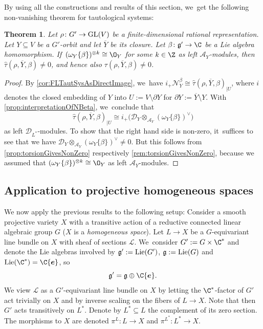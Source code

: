 \documentclass[JEP,XML,SOM,Unicode,published]{cedram}
\newcommand{\bme}{{\boldsymbol{e}}}
\newtheorem{thm}{Theorem}[section]
\newcommand{\cA}{\mathscr{A}}
\newcommand{\Ell}{\mathscr{L}}
\newcommand{\frg}{\mathfrak{g}}
\DeclareMathOperator{\GL}{\textup{GL}}
\DeclareMathOperator{\Lie}{\textup{Lie}}
\newcommand\restr[2]{{#1_{| {#2}}}}
\begin{document}
By using all the constructions and results of this section, we~get the following non-vanishing theorem for tautological systems:

\begin{thm} \label{thm:nonZeroGeneralSetup}
Let $\rho \colon G' \to \GL(V)$ be a finite-dimensional rational representation. Let $Y \subseteq V$ be a $G'$-orbit and let $\overline{Y}$ be its closure. Let $\beta \colon \frg' \to \C$ be a Lie algebra homomorphism. If~$(\omega_Y\{\beta\})^{\otimes k} \cong \O_Y$ for some $k\in \Z$ as left $\cA_Y$\nobreakdash-mod\-ules,
then $\hat{\tau}(\rho, \overline{Y}, \beta) \neq 0$, and hence also $\tau(\rho, \overline{Y}, \beta) \neq 0$.
\end{thm}

\begin{proof}
By \cref{cor:FLTautSysAsDirectImage}, we~have $i_+ \mathscr N_Y^{\beta} \cong \restr{\hat\tau(\rho,\overline Y, \beta)}{U}$, where $i$ denotes the closed embedding of $Y$ into $U := V \setminus \partial Y$ for $\partial Y := \overline Y \setminus Y$. With \cref{prop:interpretationOfNBeta}, we~conclude that
\[
\restr{\hat{\tau}(\rho,\overline Y,\beta)}{U} \cong i_+\big(\mathscr{D}_{Y} \otimes_{\cA_{Y}} (\omega_{Y}\{\beta\})^\vee\big)
\]
as left $\mathscr{D}_{L^*}$\nobreakdash-mod\-ules. To show that the right hand side is non-zero, it~suffices to see that we have $\mathscr{D}_{Y} \otimes_{\cA_{Y}} (\omega_{Y}\{\beta\})^\vee \neq 0$.
But this follows from \cref{prop:torsionGivesNonZero} respectively \cref{rem:torsionGivesNonZero}, because we assumed that $(\omega_{Y}\{\beta\})^{\otimes k} \cong \O_Y$ as left $\cA_Y$\nobreakdash-mod\-ules.
\end{proof}

\subsection{Application to projective homogeneous spaces} \label{ssec:canSheafOnLineBdl}

We now apply the previous results to the following setup: Consider a smooth projective variety $X$ with a transitive action of a reductive connected linear algebraic group $G$ (\ie $X$ is a \emph{homogeneous space}). Let $L \to X$ be a $G$-equivariant line bundle on $X$ with sheaf of sections $\Ell$. We~consider $G' := G \times \C^*$ and denote the Lie algebras involved by $\frg' := \Lie(G')$, $\frg := \Lie(G)$ and $\Lie(\C^*) = \C \bme$, so
\[
\frg' = \frg \oplus \C \bme.
\]
We view $\Ell$ as a $G'$-equivariant line bundle on $X$ by letting the $\C^*$-factor of $G'$ act trivially on $X$ and by inverse scaling on the fibers of $L \to X$. Note that then $G'$ acts transitively on $L^*$.
Denote by $L^* \subseteq L$ the complement of its zero section. The morphisms to $X$ are denoted $\pi^L \colon L \to X$ and $\pi^{L^*} \colon L^* \to X$.
\end{document}
